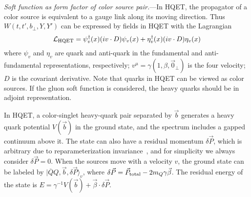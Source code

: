 \documentclass[twocolumn,aps,preprintnumbers,prd,superscriptaddress,10pt]{revtex4-1}
\begin{document}
{\it Soft function as form factor of color source pair.}---In HQET, the propagator of a color source is equivalent to a gauge link along its moving direction.
%
Thus $W(t,t',b_\perp,Y,Y')$ can be expressed by fields in HQET with the Lagrangian
\begin{align}
{\cal L_{\rm HQET}}=\psi_v^{\dagger}(x)(iv \cdot D)\psi_v(x)+\eta_v^{\dagger}(x)(iv \cdot D)\eta_v(x)
\end{align}
where $\psi_v$ and $\eta_v$ are quark and anti-quark in the fundamental and anti-fundamental representations, respectively; $v^\mu=\gamma(1,\beta,\vec 0_\perp)$ is the four velocity; $D$ is the covariant derivative.
%
Note that quarks in HQET can be viewed as color sources.
%
If the gluon soft function is considered, the heavy quarks should be in adjoint representation.

In HQET, a color-singlet heavy-quark pair separated by $\vec b$ generates a heavy quark potential $V(\vec b)$ in the ground state, and the spectrum includes a gapped continuum above it.
%
The state can also have a residual momentum $\delta\vec P$, which is arbitrary due to reparameterization invariance~\cite{Luke:1992cs,Manohar:2000dt}, and for simplicity we always consider $\delta\vec P=0$.
%
When the sources move with a velocity $v$, the ground state can be labeled by
$|\overline Q Q,\vec{b},\delta \vec P\rangle_v$, where $\delta\vec P=\vec{P}_{\rm total}-2m_Q\gamma\vec\beta$.
%
The residual energy of the state is $E=\gamma^{-1}V(\vec b)+\vec{\beta}\cdot \delta\vec P$.
\end{document}
